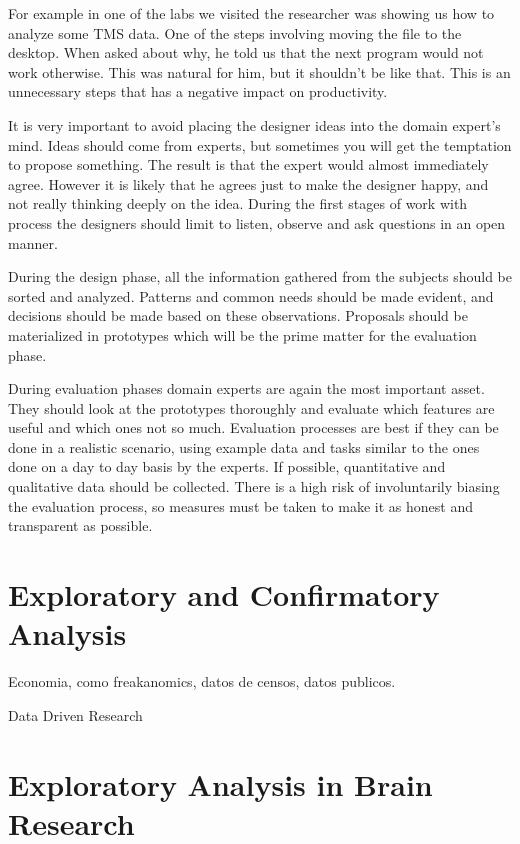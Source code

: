 For example in one of the labs we visited the researcher was showing us how to analyze some TMS data. One of the steps involving moving the file to the desktop. When asked about why, he told us that the next program would not work otherwise. This was natural for him, but it shouldn't be like that. This is an unnecessary steps that has a negative impact on productivity. 

It is very important to avoid placing the designer ideas into the domain expert's mind. Ideas should come from experts, but sometimes you will get the temptation to propose something. The result is that the expert would almost immediately agree. However it is likely that he agrees just to make the designer happy, and not really thinking deeply on the idea. During the first stages of work with process the designers should limit to listen, observe and ask questions in an open manner.

During the design phase, all the information gathered from the subjects should be sorted and analyzed. Patterns and common needs should be made evident, and decisions should be made based on these observations. Proposals should be materialized in prototypes which will be the prime matter for the evaluation phase.

During evaluation phases domain experts are again the most important asset. They should look at the prototypes thoroughly and evaluate which features are useful and which ones not so much. Evaluation processes are best if they can be done in a realistic scenario, using example data and tasks similar to the ones done on a day to day basis by the experts. If possible, quantitative and qualitative data should be collected. There is a high risk of involuntarily biasing the evaluation process, so measures must be taken to make it as honest and transparent as possible. 


\section{Exploratory and Confirmatory Analysis}



Economia, como freakanomics, datos de censos, datos publicos.

Data Driven Research

\section{Exploratory Analysis in Brain Research}


